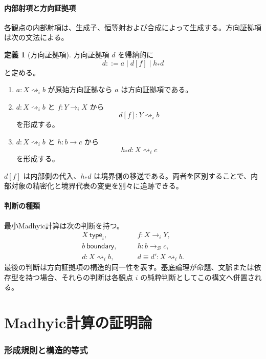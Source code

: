 \documentclass[a4paper,11pt]{ltjsarticle}
\theoremstyle{definition}
\newtheorem{definition}{定義}[section]
\theoremstyle{plain}
\newcommand{\Bdy}{\mathcal B}
\newcommand{\DEq}{\equiv}
\begin{document}
\subsection{内部射項と方向証拠項}

各観点の内部射項は、生成子、恒等射および合成によって生成する。方向証拠項は次の文法による。

\begin{definition}[方向証拠項]
方向証拠項 $d$ を帰納的に
\begin{equation}
 d::=a\mid d[f]\mid h_*d
 \label{eq:direction-term-grammar}
\end{equation}
と定める。
\begin{enumerate}
 \item $a:X\rightsquigarrow_i b$ が原始方向証拠なら $a$ は方向証拠項である。
 \item $d:X\rightsquigarrow_i b$ と $f:Y\to_i X$ から
 \[
  d[f]:Y\rightsquigarrow_i b
 \]
を形成する。
 \item $d:X\rightsquigarrow_i b$ と $h:b\to c$ から
 \[
  h_*d:X\rightsquigarrow_i c
 \]
を形成する。
\end{enumerate}
\end{definition}

$d[f]$ は内部側の代入、$h_*d$ は境界側の移送である。両者を区別することで、内部対象の精密化と境界代表の変更を別々に追跡できる。

\subsection{判断の種類}

最小Madhyic計算は次の判断を持つ。
\begin{align*}
 X\ \mathsf{type}_i,
 &\qquad
 f:X\to_iY,\\
 b\ \mathsf{boundary},
 &\qquad
 h:b\to_{\Bdy}c,\\
 d:X\rightsquigarrow_i b,
 &\qquad
 d\DEq d':X\rightsquigarrow_i b.
\end{align*}
最後の判断は方向証拠項の構造的同一性を表す。基底論理が命題、文脈または依存型を持つ場合、それらの判断は各観点 $i$ の純粋判断としてこの構文へ併置される。

\part{Madhyic計算の証明論}

\section{形成規則と構造的等式}
\end{document}
